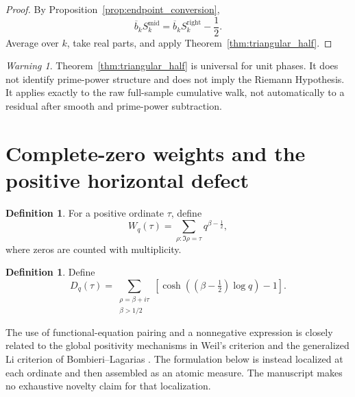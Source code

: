 \documentclass[11pt]{amsart}
\numberwithin{equation}{section}
\theoremstyle{plain}
\theoremstyle{definition}
\newtheorem{definition}[theorem]{Definition}
\theoremstyle{remark}
\newtheorem{warning}[theorem]{Warning}
\newcommand{\1}{\mathbf{1}}
\begin{document}
\begin{proof}
By Proposition~\ref{prop:endpoint_conversion},
\begin{equation}
\overline b_kS_k^{\mathrm{mid}}
=
\overline b_kS_k^{\mathrm{right}}-\frac12.
\label{eq:midpoint_corollary_step}
\end{equation}
Average over \(k\), take real parts, and apply
Theorem~\ref{thm:triangular_half}.
\end{proof}

\begin{warning}
\label{warn:triangular_scope}
Theorem~\ref{thm:triangular_half} is universal for unit phases.  It does
not identify prime-power structure and does not imply the Riemann
Hypothesis.  It applies exactly to the raw full-sample cumulative walk,
not automatically to a residual after smooth and prime-power subtraction.
\end{warning}

\section{Complete-zero weights and the positive horizontal defect}
\label{sec:positive_defect}

\begin{definition}
\label{def:complete_zero_weight}
For a positive ordinate \(\tau\), define
\begin{equation}
W_q(\tau)
=
\sum_{\rho:\Im\rho=\tau}
q^{\beta-\frac12},
\label{eq:Wq_definition}
\end{equation}
where zeros are counted with multiplicity.
\end{definition}

\begin{definition}
\label{def:Dq}
Define
\begin{equation}
D_q(\tau)
=
\sum_{\substack{\rho=\beta+i\tau\\\beta>1/2}}
\left[
\cosh\left((\beta-\tfrac12)\log q\right)-1
\right].
\label{eq:Dq_definition}
\end{equation}
\end{definition}


The use of functional-equation pairing and a nonnegative expression is
closely related to the global positivity mechanisms in Weil's criterion and
the generalized Li criterion of Bombieri--Lagarias
\cite{Weil1952,BombieriLagarias1999}.  The formulation below is instead
localized at each ordinate and then assembled as an atomic measure.  The
manuscript makes no exhaustive novelty claim for that localization.
\end{document}
